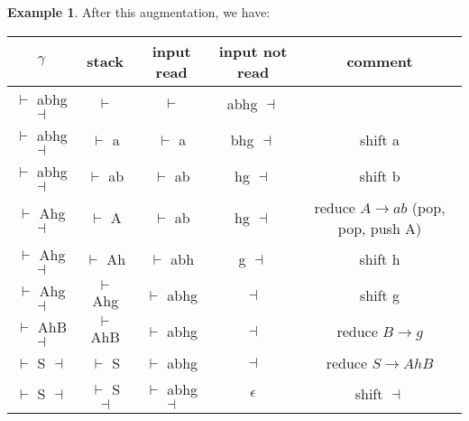 \documentclass[]{article}
\theoremstyle{definition}
\newtheorem{ex}{Example}[section]
\begin{document}
\begin{ex}
					After this augmentation, we have:
						\begin{center}
							\begin{tabular}{|c|c|c|c|c|}
								\hline
								$\gamma$ & stack & input read & input not read & comment \\ \hline
								$\vdash$ abhg $\dashv$ & $\vdash$ & $\vdash$ & abhg $\dashv$ & \\
								$\vdash$ abhg $\dashv$ & $\vdash$ a & $\vdash$ a & bhg $\dashv$ & shift a \\
								$\vdash$ abhg $\dashv$ & $\vdash$ ab & $\vdash$ ab & hg $\dashv$ & shift b \\
								$\vdash$ Ahg $\dashv$ & $\vdash$ A & $\vdash$ ab & hg $\dashv$ & reduce $A \to ab$ (pop, pop, push A) \\
								$\vdash$ Ahg $\dashv$ & $\vdash$ Ah & $\vdash$ abh & g $\dashv$ & shift h \\
								$\vdash$ Ahg $\dashv$ & $\vdash$ Ahg & $\vdash$ abhg & $\dashv$ & shift g \\
								$\vdash$ AhB $\dashv$ & $\vdash$ AhB & $\vdash$ abhg & $\dashv$ & reduce $B \to g$ \\
								$\vdash$ S $\dashv$ & $\vdash$ S & $\vdash$ abhg & $\dashv$ & reduce $S \to AhB$ \\ 
								$\vdash$ S $\dashv$ & $\vdash$ S $\dashv$ & $\vdash$ abhg $\dashv$ & $\epsilon$ & shift $\dashv$ \\ \hline
							\end{tabular}
						\end{center}
						

\end{ex}
\end{document}
